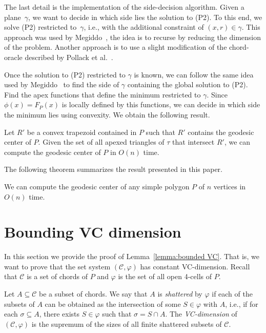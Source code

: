 \documentclass[a4paper,UKenglish]{lipics}
\newcommand{\F}[2]{\ensuremath{F_{\scriptscriptstyle #1}(#2)}}
\newcommand{\reg}{\ensuremath{R'}}
\newcommand{\tcells}{4-cells\xspace}
\begin{document}
The last detail is the implementation of the side-decision algorithm. 
Given a plane~$\gamma$, we want to decide in which side lies the solution to (P2).
To this end, we solve (P2) restricted to~$\gamma$, i.e., with the additional constraint of $(x,r)\in \gamma$. 
This approach was used by Megiddo~\cite{megiddo1989ball}, the idea is to recurse by reducing the dimension of the problem.
Another approach is to use a slight modification of the chord-oracle described by Pollack et al.~\cite[Section~3]{pollackComputingCenter}. 

Once the solution to (P2) restricted to $\gamma$ is known, we can follow the same idea used by Megiddo~\cite{megiddo1989ball} to find the side of $\gamma$ containing the global solution to (P2). 
Find the apex functions that define the minimum restricted to $\gamma$. 
Since $\phi(x) = \F{P}{x}$ is locally defined by this functions, 
we can decide in which side the minimum lies using convexity.
We obtain the following result.

\begin{lemma}
Let $\reg$ be a convex trapezoid contained in $P$ such that $\reg$ contains the geodesic center of $P$. 
Given the set of all apexed triangles of $\tau$ that intersect $\reg$, 
we can compute the geodesic center of $P$ in $O(n)$ time.
\end{lemma}

The following theorem summarizes the result presented in this paper.

\begin{theorem}
We can compute the geodesic center of any simple polygon $P$ of $n$ vertices in $O(n)$ time.
\end{theorem}





\appendix
\section{Bounding VC dimension}
In this section we provide the proof of Lemma~\ref{lemma:bounded VC}. That is, we want to prove that the set system $(\mathcal C, \varphi)$ has constant VC-dimension.
Recall that $\mathcal C$ is a set of chords of $P$ and $\varphi$ is the set of all open \tcells of $P$.
 
Let $A \subseteq \mathcal C$ be a subset of chords.
We say that $A$ is \emph{shattered} by $\varphi$ if each of the subsets of $A$ can be obtained as the intersection of some $S\in \varphi$ with $A$, i.e., if for each $\sigma\subseteq A$, there exists $S\in \varphi$ such that $\sigma = S\cap A$. 
The \emph{VC-dimension} of $(\mathcal C, \varphi)$ is the supremum of the sizes of all finite shattered subsets of $\mathcal C$.
\end{document}

